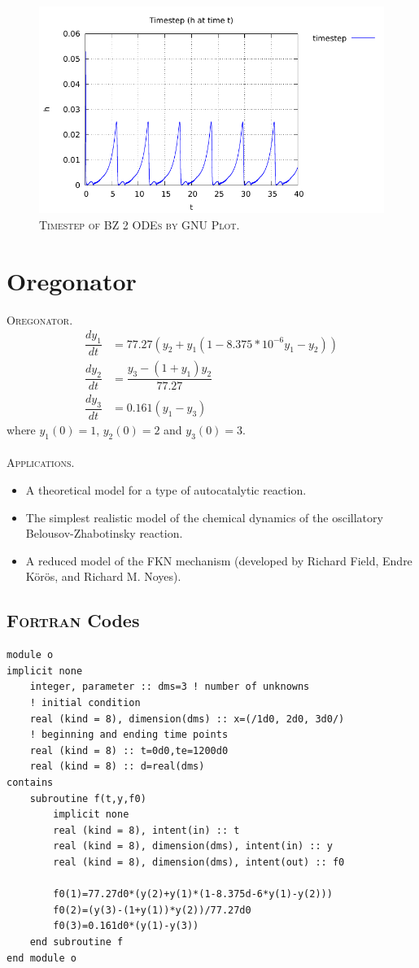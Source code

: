 \documentclass[a4paper,oneside]{book}
\numberwithin{equation}{chapter}
\begin{document}
\begin{figure}[H]
\centering
\includegraphics[scale=1.1]{bz2_ts}
\caption{\textsc{Timestep of BZ 2 ODEs by GNU Plot.}}
\end{figure}

\section{Oregonator}
\textsc{Oregonator.} 
\begin{align}
    \dfrac{dy_1}{dt}  &=  77.27 \left(y_2  +  y_1 \left(1 - 8.375*10^{-6} y_1 - y_2\right) \right)
    \\
    \dfrac{dy_2}{dt}  &=  \dfrac{y_3 - \left(1+y_1\right)y_2}{77.27}
    \\
    \dfrac{dy_3}{dt}  &=  0.161\left(y_1-y_3\right)
\end{align}
where $y_1\left(0\right) = 1$, $y_2\left(0\right) = 2$ and $y_3\left(0\right) = 3$.\\
\\
\textsc{Applications.}
\begin{itemize}
\item A theoretical model for a type of autocatalytic reaction.
\item The simplest realistic model of the chemical dynamics of the oscillatory Belousov-Zhabotinsky reaction.
\item A reduced model of the FKN mechanism (developed by Richard Field, Endre K\"{o}r\"{o}s, and Richard M. Noyes).
\end{itemize}
\subsection{\textsc{Fortran} Codes}
\begin{lstlisting}
module o  
implicit none 
	integer, parameter :: dms=3 ! number of unknowns
	! initial condition
	real (kind = 8), dimension(dms) :: x=(/1d0, 2d0, 3d0/) 
    ! beginning and ending time points
	real (kind = 8) :: t=0d0,te=1200d0 
	real (kind = 8) :: d=real(dms)
contains      
	subroutine f(t,y,f0)
		implicit none
		real (kind = 8), intent(in) :: t
		real (kind = 8), dimension(dms), intent(in) :: y
		real (kind = 8), dimension(dms), intent(out) :: f0
		
		f0(1)=77.27d0*(y(2)+y(1)*(1-8.375d-6*y(1)-y(2)))
		f0(2)=(y(3)-(1+y(1))*y(2))/77.27d0
		f0(3)=0.161d0*(y(1)-y(3))
	end subroutine f
end module o 
\end{lstlisting}
\end{document}
